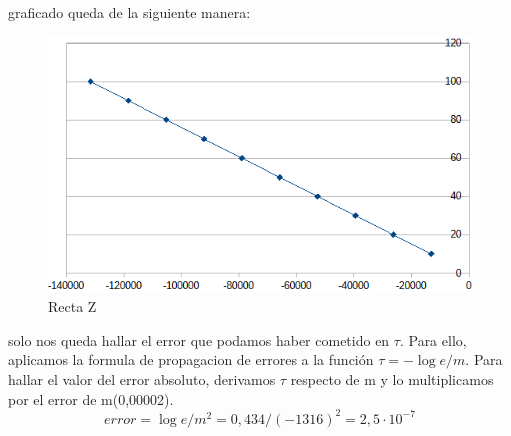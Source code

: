 \documentclass{article}
\begin{document}
graficado queda de la siguiente manera:
\begin{figure}[H]
    \centering
    \includegraphics[width=1\linewidth]{image3.png}
    \caption{Recta Z}
    \label{fig:enter-label}
\end{figure}
solo nos queda hallar el error que podamos haber cometido en $\tau$. Para ello, aplicamos la formula de propagacion de errores a la función $\tau=-\log e /m$. Para hallar el valor del error absoluto, derivamos $\tau$ respecto de m y lo multiplicamos por el error de m(0,00002).
\begin{equation}
    error=\log e/m^2=0,434/(-1316)^2=2,5\cdot10^{-7}
\end{equation}
\end{document}
